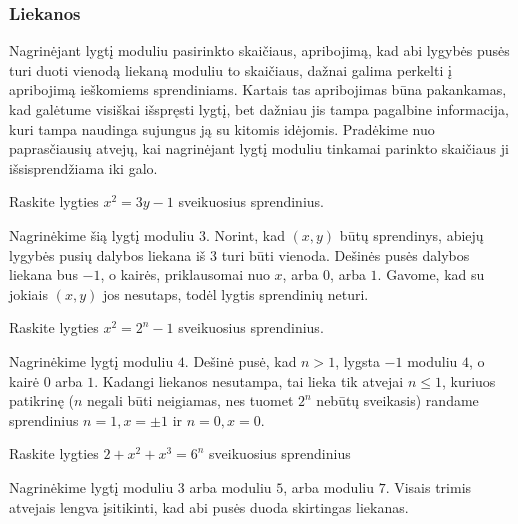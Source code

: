 \subsubsection{Liekanos}

Nagrinėjant lygtį moduliu pasirinkto skaičiaus, apribojimą, kad abi lygybės
pusės turi duoti vienodą liekaną moduliu to skaičiaus, dažnai galima
perkelti į apribojimą ieškomiems sprendiniams. Kartais tas apribojimas būna
pakankamas, kad galėtume visiškai išspręsti lygtį, bet dažniau jis tampa
pagalbine informacija, kuri tampa naudinga sujungus ją su kitomis idėjomis.
Pradėkime nuo paprasčiausių atvejų, kai nagrinėjant lygtį moduliu tinkamai
parinkto skaičiaus ji išsisprendžiama iki galo.

\begin{pav} Raskite lygties $x^2 = 3y - 1$ sveikuosius sprendinius.
\end{pav}

\begin{sprendimas}
Nagrinėkime šią lygtį moduliu $3$. Norint, kad $(x,y)$ būtų sprendinys,
abiejų lygybės pusių dalybos liekana iš $3$ turi būti vienoda. Dešinės
pusės dalybos liekana bus $-1$, o kairės, priklausomai nuo $x$, arba
$0$, arba $1$. Gavome, kad su jokiais $(x,y)$ jos nesutaps, todėl lygtis
sprendinių neturi.
\end{sprendimas}

\begin{pav} Raskite lygties $x^2 = 2^n - 1$ sveikuosius sprendinius. 
\end{pav}

\begin{sprendimas}
  Nagrinėkime lygtį moduliu $4$. Dešinė pusė, kad $n>1$, lygsta $-1$ moduliu
  $4$, o kairė $0$ arba $1$. Kadangi liekanos nesutampa, tai lieka tik
  atvejai $n\leq 1$, kuriuos patikrinę ($n$ negali būti neigiamas, nes
  tuomet $2^n$ nebūtų sveikasis) randame sprendinius $n=1, x=\pm 1$ ir
  $n=0, x=0$. 
\end{sprendimas}

\begin{pav} Raskite lygties $2 + x^2 + x^3 = 6^n$ sveikuosius sprendinius
\end{pav}

\begin{sprendimas}
  Nagrinėkime lygtį moduliu $3$ arba moduliu $5$, arba moduliu $7$. Visais
  trimis atvejais lengva įsitikinti, kad abi pusės duoda skirtingas
  liekanas.
\end{sprendimas}

